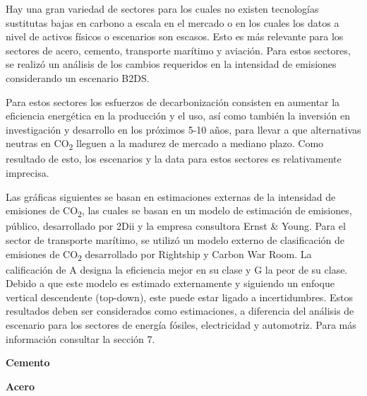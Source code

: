 \documentclass[10pt,table]{article}\usepackage[]{graphicx}\usepackage[]{color}
\begin{document}
	\begin{multicols}{2}
		Hay una gran variedad de sectores para los cuales no existen tecnologías sustitutas bajas en carbono a escala en el mercado o en los cuales los datos a nivel de activos físicos o escenarios son escasos.  Esto es más relevante para los sectores de acero, cemento, transporte marítimo y aviación. Para estos sectores, se realizó un análisis de los cambios requeridos en la intensidad de emisiones considerando un escenario B2DS. 
	
		Para estos sectores los esfuerzos de decarbonización consisten en aumentar la eficiencia energética en la producción y el uso, así como también la inversión en investigación y desarrollo en los próximos 5-10 años, para llevar a que alternativas neutras en CO\textsubscript{2} lleguen a la madurez de mercado a mediano plazo. Como resultado de esto, los escenarios y la data para estos sectores es relativamente imprecisa.
		
		
		Las gráficas siguientes se basan en estimaciones externas de la intensidad de emisiones de CO\textsubscript{2}, las cuales se basan en un modelo de estimación de emisiones, público, desarrollado por 2Dii y la empresa consultora Ernst \& Young. Para el sector de transporte marítimo, se utilizó un modelo externo de clasificación de emisiones de CO\textsubscript{2} desarrollado por Rightship y Carbon War Room. La calificación de A designa la eficiencia mejor en su clase y G la peor de su clase. Debido a que este modelo es estimado externamente y siguiendo un enfoque vertical descendente (top-down), este puede estar ligado a incertidumbres. Estos resultados deben ser considerados como estimaciones, a diferencia del análisis de escenario para los sectores de energía fósiles, electricidad y automotriz. Para más información consultar la sección 7.
		
	\end{multicols}
\vspace{-0.5cm}
	
	\begin{multicols}{2}
		
		\textbf{Cemento}
		
		\textbf{Acero}
		
	\end{multicols}
	
	\setlength\multicolsep{0pt}
	\vspace{0cm}
	
\end{document}
